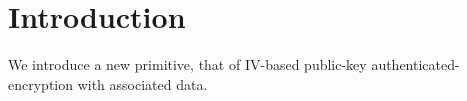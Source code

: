 \section{Introduction}
\label{sec:intro}
We introduce a new primitive, that of IV-based public-key authenticated-encryption with associated data.